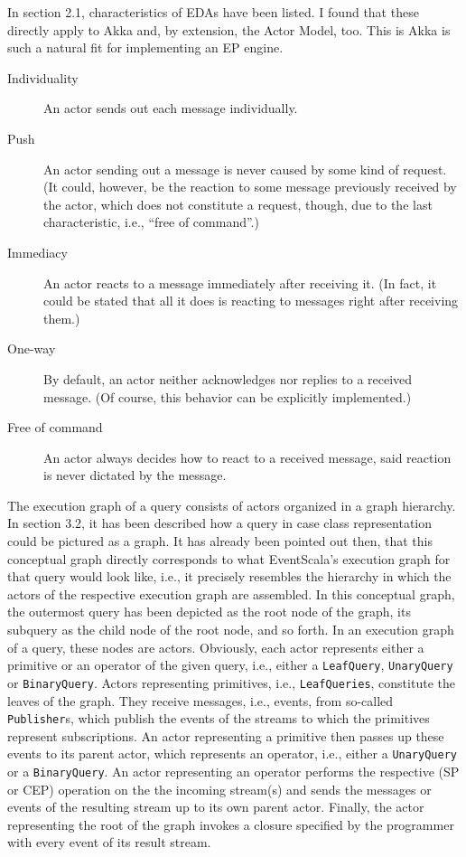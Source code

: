 \documentclass[article, type=bsc, colorback, accentcolor=tud8b, parskip=half, bibliography=totocnumbered]{tudthesis}
\begin{document}
In section 2.1, characteristics of EDAs \cite{Chandy:2009:EPD:1594754} have been listed.
I found that these directly apply to Akka and, by extension, the Actor Model, too.
This is Akka is such a natural fit for implementing an EP engine.

\begin{description}

\item[Individuality]
An actor sends out each message individually.

\item[Push]
An actor sending out a message is never caused by some kind of request.
(It could, however, be the reaction to some message previously received by the actor, which does not constitute a request, though, due to the last characteristic, i.e., ``free of command''.)

\item[Immediacy]
An actor reacts to a message immediately after receiving it.
(In fact, it could be stated that all it does is reacting to messages right after receiving them.)

\item[One-way]
By default, an actor neither acknowledges nor replies to a received message. (Of course, this behavior can be explicitly implemented.)

\item[Free of command]
An actor always decides how to react to a received message, said reaction is never dictated by the message.

\end{description}

The execution graph of a query consists of actors organized in a graph hierarchy.
In section 3.2, it has been described how a query in case class representation could be pictured as a graph.
It has already been pointed out then, that this conceptual graph directly corresponds to what EventScala's execution graph for that query would look like, i.e., it precisely resembles the hierarchy in which the actors of the respective execution graph are assembled.
In this conceptual graph, the outermost query has been depicted as the root node of the graph, its subquery as the child node of the root node, and so forth.
In an execution graph of a query, these nodes are actors.
Obviously, each actor represents either a primitive or an operator of the given query, i.e., either a \lstinline{LeafQuery}, \lstinline{UnaryQuery} or \lstinline{BinaryQuery}.
Actors representing primitives, i.e., \lstinline{LeafQueries}, constitute the leaves of the graph.
They receive messages, i.e., events, from so-called \lstinline{Publisher}s, which publish the events of the streams to which the primitives represent subscriptions.
An actor representing a primitive then passes up these events to its parent actor, which represents an operator, i.e., either a \lstinline{UnaryQuery} or a \lstinline{BinaryQuery}.
An actor representing an operator performs the respective (SP or CEP) operation on the the incoming stream(s) and sends the messages or events of the resulting stream up to its own parent actor.
Finally, the actor representing the root of the graph invokes a closure specified by the programmer with every event of its result stream.
\end{document}
